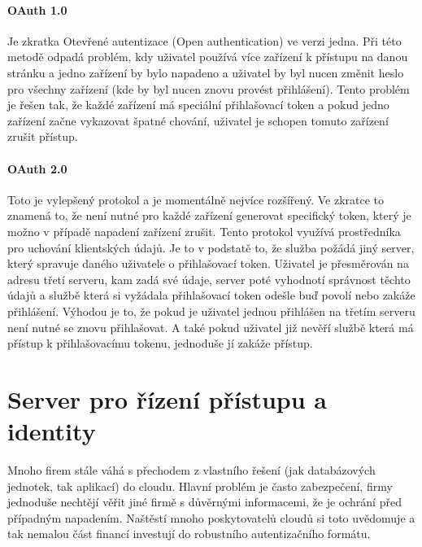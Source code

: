 \paragraph{OAuth 1.0} Je zkratka Otevřené autentizace (Open authentication) ve verzi jedna. Při této metodě odpadá problém, kdy uživatel používá více zařízení k přístupu na danou stránku a jedno zařízení by bylo napadeno a uživatel by byl nucen změnit heslo pro všechny zařízení (kde by byl nucen znovu provést přihlášení). Tento problém je řešen tak, že každé zařízení má speciální přihlašovací token a pokud jedno zařízení začne vykazovat špatné chování, uživatel je schopen tomuto zařízení zrušit přístup. \cite{rest-cookbook}

\paragraph{OAuth 2.0} Toto je vylepšený protokol a je momentálně nejvíce rozšířený. Ve zkratce to znamená to, že není nutné pro každé zařízení generovat specifický token, který je možno v případě napadení zařízení zrušit. Tento protokol využívá prostředníka pro uchování klientských údajů. Je to v podstatě to, že služba požádá jiný server, který spravuje daného uživatele o přihlašovací token. Uživatel je přesměrován na adresu třetí serveru, kam zadá své údaje, server poté vyhodnotí správnost těchto údajů a službě která si vyžádala přihlašovací token odešle buď povolí nebo zakáže přihlášení. Výhodou je to, že pokud je uživatel jednou přihlášen na třetím serveru není nutné se znovu přihlašovat. A také pokud uživatel již nevěří službě která má přístup k přihlašovacímu tokenu, jednoduše jí zakáže přístup. \cite{rest-cookbook}

\section{Server pro řízení přístupu a identity}
\par Mnoho firem stále váhá s přechodem z vlastního řešení (jak databázových jednotek, tak aplikací) do cloudu. Hlavní problém je často zabezpečení, firmy jednoduše nechtějí věřit jiné firmě s důvěrnými informacemi, že je ochrání před případným napadením. Naštěstí mnoho poskytovatelů cloudů si toto uvědomuje a tak nemalou část financí investují do robustního autentizačního formátu. \cite{cloud-security}

